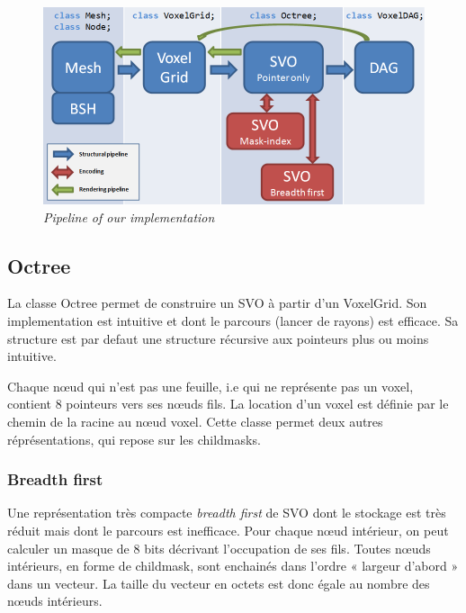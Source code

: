 \documentclass[a4paper]{article}
\begin{document}
\begin{figure}
\centering
\includegraphics[width=1\textwidth]{ClassGraph.png}
\caption{\label{fig:triceratops}\textit{Pipeline of our implementation}}
\end{figure}


\subsection{Octree}
La classe Octree permet de construire un SVO à partir d'un VoxelGrid. Son implementation est intuitive et dont le parcours (lancer de rayons) est efficace. Sa structure est par defaut une structure récursive aux pointeurs plus ou moins intuitive.


Chaque nœud qui n’est pas une feuille, i.e qui ne représente pas un voxel, contient 8 pointeurs vers ses nœuds fils. La location d'un voxel est définie par le chemin de la racine au nœud voxel. Cette classe permet deux autres réprésentations, qui repose sur les childmasks. \\ 

\subsubsection{Breadth first} %
\label{ssub:breadth_first}
Une représentation très compacte \textit{breadth first} de SVO dont le stockage est très réduit mais dont le parcours est inefficace. Pour chaque nœud intérieur, on peut calculer un masque de 8 bits décrivant l’occupation de ses fils. Toutes nœuds intérieurs, en forme de childmask, sont enchainés dans l’ordre « largeur d’abord » dans un vecteur. La taille du vecteur en octets est donc égale au nombre des nœuds intérieurs. \\
\end{document}
